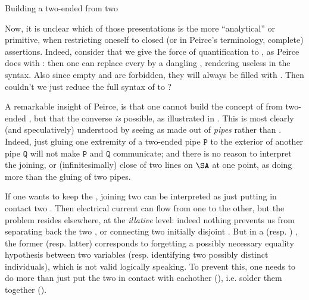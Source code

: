 \begin{scope}
\begin{scope}
\begin{marginfigure}
  \begin{center}
  \end{center}
  \caption{Building a two-ended  from two }
\end{marginfigure}

Now, it is unclear which of those presentations is the more ``analytical'' or
primitive, when restricting oneself to closed (or in Peirce's terminology,
complete) assertions. Indeed, consider that we give the force of quantification
to , as Peirce does with : then one can replace every  by a
dangling , rendering  useless in the syntax. Also since empty 
and  are forbidden, they will always be filled with . Then
couldn't we just reduce the full syntax of  to ?

A remarkable insight of Peirce, is that one cannot build the concept of
 from two-ended , but that the converse \emph{is}
possible, as illustrated in . This is most clearly (and
speculatively) understood by seeing  as made out of \emph{pipes} rather
than . Indeed, just gluing one extremity of a two-ended pipe
$\mathtt{P}$ to the exterior of another pipe $\mathtt{Q}$ will not make
$\mathtt{P}$ and $\mathtt{Q}$ communicate; and there is no reason to interpret
the joining, or (infinitesimally) close  of two lines on $\SA$
at one point, as doing more than the gluing of two pipes.

\begin{digression}
  If one wants to keep the  , joining two  can be
interpreted as just putting in contact two . Then electrical current
can flow from one  to the other, but the problem resides elsewhere, at
the \emph{illative} level: indeed nothing prevents us from separating back the
two , or connecting two initially disjoint . But in a
 (resp. ) , the former (resp. latter)
 corresponds to forgetting a possibly necessary equality hypothesis
between two variables (resp. identifying two possibly distinct individuals),
which is not valid logically speaking. To prevent this, one needs to do more
than just put the two  in contact with eachother (),
i.e. solder them together ().
\end{digression}


\end{scope}
\end{scope}
